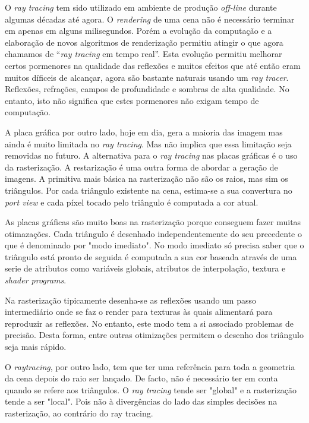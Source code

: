 \documentclass[12pt]{article}
\begin{document}
O {\it ray tracing} tem sido utilizado em ambiente de produção {\it off-line} durante algumas décadas até agora. O {\it rendering} de uma cena não é necessário terminar em apenas em alguns milisegundos. Porém a evolução da computação e a elaboração de novos algoritmos de renderização permitiu atingir o que agora chamamos de ``{\it ray tracing} em tempo real''. Esta evolução permitiu melhorar certos pormenores na qualidade das reflexões e muitos efeitos que até então eram muitos díficeis de alcançar, agora são bastante naturais usando um \textsl{ray tracer}. Reflexões, refrações, campos de profundidade e sombras de alta qualidade. No entanto, isto não significa que estes pormenores não exigam tempo de computação.\newline

A placa gráfica por outro lado, hoje em dia, gera a maioria das imagem mas ainda é muito limitada no \textit{ray tracing}. Mas não implica que essa limitação seja removidas no futuro. A alternativa para o \textit{ray tracing} nas placas gráficas é o uso da rasterização. A restarização é uma outra forma de abordar a geração de imagens.
A primitiva mais básica na rasterização não são os raios, mas sim os triângulos. Por cada triângulo existente na cena, estima-se a sua convertura no {\it port view} e cada píxel tocado pelo triângulo é computada a cor atual.\newline

As placas gráficas são muito boas na rasterização porque conseguem fazer muitas otimazações. Cada triângulo é desenhado independentemente do seu precedente o que é denominado por "modo imediato". No modo imediato só precisa saber que o triângulo está pronto de seguida é computada a sua cor baseada através de uma serie de atributos como variáveis globais, atributos de interpolação, textura e {\it shader programs}.\newline

Na rasterização tipicamente desenha-se as reflexões usando um passo intermediário onde se faz o render para texturas às quais alimentará para reproduzir as reflexões. No entanto, este modo tem a si associado problemas de precisão. Desta forma, entre outras otimizações permitem o desenho dos triângulo seja mais rápido.\newline

O \textit{raytracing}, por outro lado, tem que ter uma referência para toda a geometria da cena depois do raio ser lançado. De facto, não é necessário ter em conta quando se refere aos triângulos. O \textit{ray tracing} tende ser "global" e a rasterização tende a ser "local". Pois não à divergências do lado das simples decisões na rasterização, ao contrário do ray tracing.\newline
\end{document}

